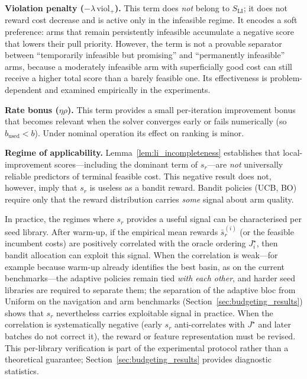 \documentclass[lettersize,journal]{IEEEtran}
\begin{document}
\textbf{Violation penalty ($-\lambda\,\mathrm{viol}_+$).}  This term does \emph{not} belong to $S_{\mathrm{LI}}$; it does not reward cost decrease and is active only in the infeasible regime.  It encodes a soft preference: arms that remain persistently infeasible accumulate a negative score that lowers their pull priority.  However, the term is not a provable separator between ``temporarily infeasible but promising'' and ``permanently infeasible'' arms, because a moderately infeasible arm with superficially good cost can still receive a higher total score than a barely feasible one.  Its effectiveness is problem-dependent and examined empirically in the experiments.

\textbf{Rate bonus ($\eta\rho$).}  This term provides a small per-iteration improvement bonus that becomes relevant when the solver converges early or fails numerically (so $b_{\mathrm{used}} < b$).  Under nominal operation its effect on ranking is minor.

\textbf{Regime of applicability.}  Lemma~\ref{lem:li_incompleteness} establishes that local-improvement scores---including the dominant term of $s_r$---are \emph{not} universally reliable predictors of terminal feasible cost.  This negative result does not, however, imply that $s_r$ is useless as a bandit reward.  Bandit policies (UCB, BO) require only that the reward distribution carries \emph{some} signal about arm quality.

In practice, the regimes where $s_r$ provides a useful signal can be characterised per seed library.  After warm-up, if the empirical mean rewards $\bar{s}_r^{(i)}$ (or the feasible incumbent costs) are positively correlated with the oracle ordering $J_i^\star$, then bandit allocation can exploit this signal.  When the correlation is weak---for example because warm-up already identifies the best basin, as on the current benchmarks---the adaptive policies remain tied \emph{with each other}, and harder seed libraries are required to separate them; the separation of the adaptive bloc from Uniform on the navigation and arm benchmarks (Section~\ref{sec:budgeting_results}) shows that $s_r$ nevertheless carries exploitable signal in practice.  When the correlation is systematically negative (early $s_r$ anti-correlates with $J^\star$ and later batches do not correct it), the reward or feature representation must be revised.  This per-library verification is part of the experimental protocol rather than a theoretical guarantee; Section~\ref{sec:budgeting_results} provides diagnostic statistics.
\end{document}
